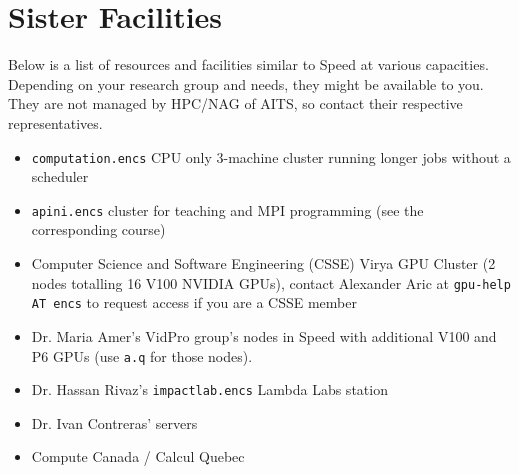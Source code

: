 \documentclass{easychair}
\begin{document}
\section{Sister Facilities}

Below is a list of resources and facilities similar to Speed at various capacities.
Depending on your research group and needs, they might be available to you. They
are not managed by HPC/NAG of AITS, so contact their respective representatives.

\begin{itemize}
\item
\texttt{computation.encs} CPU only 3-machine cluster running longer jobs
without a scheduler
\item
\texttt{apini.encs} cluster for teaching and MPI programming (see the corresponding
course)
\item
Computer Science and Software Engineering (CSSE) Virya GPU Cluster
(2 nodes totalling 16 V100 NVIDIA GPUs), contact Alexander Aric at \texttt{gpu-help AT encs}
to request access if you are a CSSE member
\item
Dr. Maria Amer's VidPro group's nodes in Speed with additional V100 and P6 GPUs
(use \texttt{a.q} for those nodes).
\item
Dr. Hassan Rivaz's \texttt{impactlab.encs} Lambda Labs station
\item
Dr. Ivan Contreras' servers
\item
Compute Canada / Calcul Quebec
\end{itemize}


%

\nocite{aosa-book-vol1}
\label{sect:bib}
%

%
%
%
\clearpage
{} 


\end{document}
